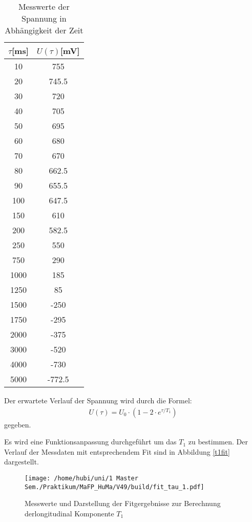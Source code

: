 \begin{table}
  \centering
  \caption{Messwerte der Spannung in Abhängigkeit der Zeit}
  \label{tabmess1}
  \begin{tabular}{c|c}
    \toprule
    $\tau$[ms] & $U(\tau)$[mV]\\
    \midrule
    10 & 755 \\
    20 & 745.5\\
    30 & 720\\
    40 & 705\\
    50 & 695\\
    60 & 680\\
    70 & 670\\
    80 & 662.5\\
    90 & 655.5\\
    100& 647.5\\
    150& 610\\
    200& 582.5\\
    250& 550\\
    750& 290\\
    1000& 185\\
    1250& 85\\
    1500& -250\\
    1750& -295\\
    2000& -375\\
    3000& -520\\
    4000& -730\\
    5000& -772.5\\
    \bottomrule
  \end{tabular}
\end{table}

Der erwartete Verlauf der Spannung wird durch die Formel:
\begin{align}
    \label{fidformel}
    U(\tau)=U_0 \cdot (1-2\cdot e^{\tau/T_1})
\end{align}
gegeben.

Es wird eine Funktionsanpassung durchgeführt um das $T_1$ zu bestimmen.
Der Verlauf der Messdaten mit entsprechendem Fit sind in Abbildung \ref{t1fit}
dargestellt.


\begin{figure}
\centering
\texttt{[image: /home/hubi/uni/1 Master Sem./Praktikum/MaFP\_HuMa/V49/build/fit\_tau\_1.pdf]}
\caption{Messwerte und Darstellung der Fitgergebnisse zur Berechnung
derlongitudinal Komponente $T_1$}
\label{plot1}
\end{figure}

